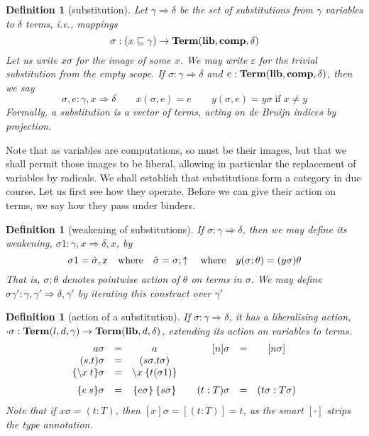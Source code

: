 \documentclass{jfp1}
\newtheorem{definition}[theorem]{Definition}
\newcommand{\emp}{\varepsilon}
\newcommand{\grp}[1]{\{ #1 \}}
\begin{document}
\newcommand{\su}{\Rightarrow}
\begin{definition}[substitution]
  Let $\gamma\su\delta$ be the set of substitutions from $\gamma$ variables to $\delta$ terms,
  i.e., mappings \[\sigma : (x\sqsubseteq\gamma) \to \mathbf{Term}(\textbf{lib},\textbf{comp},\delta)\]
  Let us write $x\sigma$ for the image of some $x$. We may write $\emp$ for the trivial
  substitution from the empty scope. If $\sigma : \gamma \su \delta$
  and $e : \mathbf{Term}(\textbf{lib},\textbf{comp},\delta)$, then we say
  \[\sigma,e : \gamma,x \su \delta\qquad x(\sigma,e) = e\qquad
    y(\sigma,e) = y\sigma\;\mbox{if}\;x\neq y\]
  Formally, a substitution is a vector of terms, acting on de Bruijn indices by
  projection.
\end{definition}

Note that as variables are computations, so must be their images, but that we shall permit
those images to be liberal, allowing in particular the replacement of variables by radicals.
We shall establish that substitutions form a category in due
course. Let us first see how they operate. Before we can give their action on terms, we say how they
pass under binders.

\begin{definition}[weakening of substitutions]
  If $\sigma : \gamma\su\delta$, then we may define its weakening, $\sigma1 : \gamma,x\su\delta,x$,
  by
  \[\sigma1 = \hat\sigma,x  \quad\mbox{where}\quad \hat\sigma = \sigma;\uparrow
     \quad\mbox{where}\quad y(\sigma;\theta) = (y\sigma)\theta
  \]
  That is, $\sigma;\theta$ denotes pointwise action of $\theta$ on terms in $\sigma$.
  We may define $\sigma\gamma' : \gamma,\gamma' \su \delta,\gamma'$ by iterating this construct
  over $\gamma'$
\end{definition}

\begin{definition}[action of a substitution]
  If $\sigma:\gamma\su \delta$, it has a liberalising action,
  $\cdot\sigma:\mathbf{Term}(l,d,\gamma)\to\mathbf{Term}(\textbf{lib},d,\delta)$, extending its action on variables
  to terms.
  \[
    \begin{array}{rlc@{\qquad}rlc}
      a\sigma & = & a & [n]\sigma & = & [n\sigma] \\
      (s.t)\sigma & = & (s\sigma.t\sigma) && \\
      \grp{\la x t}\sigma & = & \la x \grp{t(\sigma1)} && \medskip\\
      \grp{e\:s}\sigma & = & \grp{e\sigma}\:\grp{s\sigma} & (t:T)\sigma & = & (t\sigma:T\sigma)
    \end{array}
  \]
  Note that if $x\sigma = (t:T)$, then $[x]\sigma = [(t:T)] = t$, as the smart $[\cdot]$ strips
  the type annotation.
\end{definition}
\end{document}

